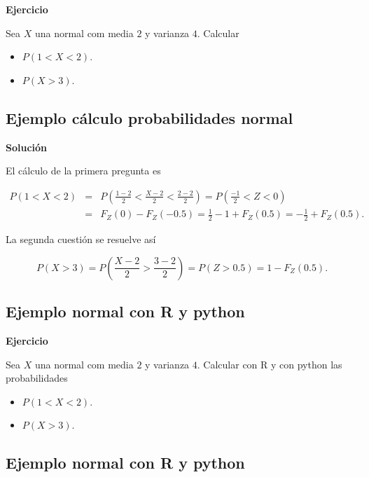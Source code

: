 \documentclass[]{book}
\providecommand{\tightlist}{%
  \setlength{\itemsep}{0pt}\setlength{\parskip}{0pt}}
\begin{document}
\textbf{Ejercicio}

Sea \(X\) una normal com media \(2\) y varianza \(4\). Calcular

\begin{itemize}
\tightlist
\item
  \(P(1< X< 2).\)
\item
  \(P(X>3).\)
\end{itemize}

\hypertarget{ejemplo-cuxe1lculo-probabilidades-normal-1}{%
\subsection{Ejemplo cálculo probabilidades normal}\label{ejemplo-cuxe1lculo-probabilidades-normal-1}}

\textbf{Solución}

El cálculo de la primera pregunta es

\[
\begin{eqnarray*}
P(1< X< 2)&=& P\left(\frac{1-2}{2}<\frac{X-2}{2}<\frac{2-2}{2}\right)= P\left(\frac{-1}{2}<Z<0\right)\\
&=& F_{Z}(0)-F_{Z}(-0.5)=\frac12-1+F_{Z}(0.5)=-\frac12+F_Z(0.5).
\end{eqnarray*}
\]

La segunda cuestión se resuelve así

\[
P(X>3)=P\left(\frac{X-2}2>\frac{3-2}{2}\right)=P(Z>0.5)=1-F_{Z}(0.5).
\]

\hypertarget{ejemplo-normal-con-r-y-python}{%
\subsection{Ejemplo normal con R y python}\label{ejemplo-normal-con-r-y-python}}

\textbf{Ejercicio}

Sea \(X\) una normal com media \(2\) y varianza \(4\). Calcular con R y con python las probabilidades

\begin{itemize}
\tightlist
\item
  \(P(1< X< 2).\)
\item
  \(P(X>3).\)
\end{itemize}

\hypertarget{ejemplo-normal-con-r-y-python-1}{%
\subsection{Ejemplo normal con R y python}\label{ejemplo-normal-con-r-y-python-1}}
\end{document}
